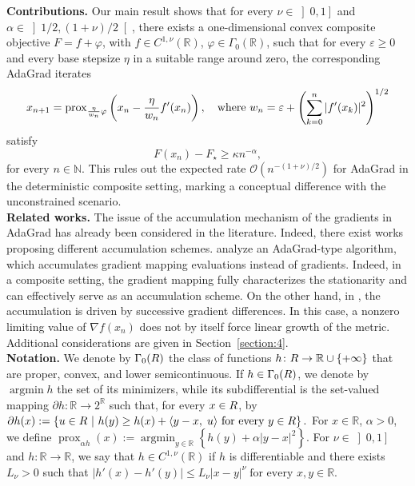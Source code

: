 \documentclass[11pt]{article}
\newcommand{\R}{\mathbb{R}}
\newcommand{\N}{\mathbb{N}}
\newcommand{\argmin}{\operatorname*{argmin}}
\newcommand{\prox}{\operatorname{prox}}
\begin{document}
\noindent
\textbf{Contributions. }Our main result shows that for every \(\nu\in\left]0,1\right]\) and $\alpha\in\left]1/{2},(1+\nu)/{2}\right[$, there exists a one-dimensional convex composite objective \(F=f+\varphi\), with \(f\in C^{1,\nu}(\R)\), $\varphi\in\Gamma_0(\R)$, such that for every \(\varepsilon\ge0\) and every base stepsize \(\eta\) in a suitable range around zero, the corresponding AdaGrad iterates 
\begin{equation}\label{update}
    x_{n+1}
    =
    \prox_{\frac{\eta}{w_n}\varphi}
    \left(
        x_n-\frac{\eta}{w_n}f'(x_n)
    \right), \quad {\rm where}\,\, w_n
    =
    \varepsilon+
    \left(
        \sum_{k=0}^n |f'(x_k)|^2
    \right)^{1/2}
\end{equation}
satisfy
\[
    F(x_n)-F_\star
    \ge \kappa
    n^{-\alpha},
\]
for every $n\in\N$. This rules out the expected rate  \(\mathcal{O}(n^{ -(1+\nu)/2})\)
for AdaGrad in the deterministic composite setting, marking a conceptual difference with the unconstrained scenario. \\

\noindent
\textbf{Related works. }The issue of the accumulation mechanism of the gradients in AdaGrad has already been considered in the literature. Indeed, there exist works proposing different accumulation schemes. 
\citet{antonakopoulos2025adaptive,wang2026universal} analyze an AdaGrad-type algorithm, which accumulates gradient mapping evaluations instead of gradients. Indeed, in a composite setting, the gradient mapping fully characterizes the stationarity and can effectively serve as an accumulation scheme. On the other hand, in \citep{bojovic2026adagrad}, the accumulation is driven by successive gradient differences. In this case, a nonzero limiting value of $\nabla f(x_n)$ does not by itself force linear growth of the metric. Additional considerations are given in Section~\ref{section:4}. \\

\noindent
\textbf{Notation. }We denote by \(\Gamma_0(\mathcal \R)\) the class of functions
\(h\colon\mathcal \R\to\R\cup\{+\infty\}\) that are proper, convex, and lower
semicontinuous. If \(h\in\Gamma_0(\mathcal \R)\), we denote by
\(\argmin h\) the set of its minimizers, while its subdifferential is the set-valued mapping
$\partial h\colon \R\to 2^\R$
such that, for every \(x\in\mathcal \R\), by
\(
    \partial h(x)
    :=
    \left\{
        u\in\mathcal \R
        \ \middle|\
        h(y)\ge h(x)+\langle{y-x},\;{u}\rangle
        \text{ for every }y\in\mathcal \R
    \right\}.
\)
For $x\in\R$, $\alpha>0$, we define $\prox_{\alpha h}(x)
    :=
    \argmin_{y\in\R}
    \left\{
        h(y)+\alpha\vert y-x\vert^2
    \right\}$. For $\nu\in \left]0,1\right]$ and $h\colon\R\to\R$, we say that \(h\in C^{1,\nu}(\R)\) if \(h\) is differentiable and there exists \(L_\nu>0\) such that $|h'(x)-h'(y)|
    \le
    L_\nu |x-y|^\nu
    \;
    \text{for every }x,y\in\R$.
\end{document}
